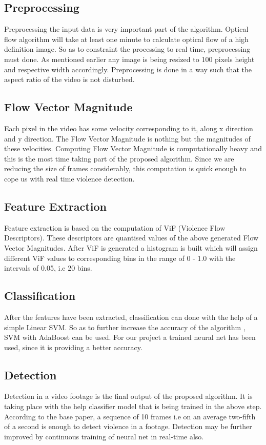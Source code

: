 \subsection{Preprocessing}
Preprocessing the input data is very important part of the algorithm. Optical flow algorithm will take at least one minute to calculate optical flow of a high definition image. So as to constraint the processing to real time, preprocessing must done. As mentioned earlier any image is being resized to 100 pixels height and respective width accordingly. Preprocessing is done in a way such that the aspect ratio of the video is not disturbed.
\subsection{Flow Vector Magnitude}
Each pixel in the video has some velocity corresponding to it, along x direction and y direction. The Flow Vector Magnitude is nothing but the magnitudes of these velocities. Computing Flow Vector Magnitude is computationally heavy and this is the most time taking part of the proposed algorithm. Since we are reducing the size of frames considerably, this computation is quick enough to cope us with real time violence detection.
\subsection{Feature Extraction}
Feature extraction is based on the computation of ViF (Violence Flow Descriptors)\cite{hassner}. These descriptors are quantised values of the above generated Flow Vector Magnitudes. After ViF is generated a histogram is built which will assign different ViF values to corresponding bins in the range of 0 - 1.0 with the intervals of 0.05, i.e 20 bins.
\subsection{Classification}
After the features have been extracted, classification can done with the help of a simple Linear SVM. So as to further increase the accuracy of the algorithm , SVM with AdaBoost can be used. For our project a trained neural net has been used, since it is providing a better accuracy.
\subsection{Detection}
Detection in a video footage is the final output of the proposed algorithm. It is taking place with the help classifier model that is being trained in the above step. According to the base paper, a sequence of 10 frames i.e on an average two-fifth of a second is enough to detect violence in a footage. Detection may be further improved by continuous training of neural net in real-time also.
